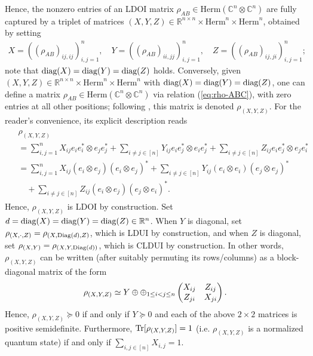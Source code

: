 \documentclass[11pt]{article}
\newcommand{\R}{\ensuremath{\mathbb{R}}}   %
\newcommand{\C}{\ensuremath{\mathbb{C}}} %
\newcommand{\Herm}{\mathrm{Herm}}
\newcommand{\Cnn}{\C^n\ot \C^n}
\newcommand{\Tr}{\text{\rm Tr}}
\newcommand{\diag}{\text{\rm diag}}
\newcommand{\Diag}{\text{\rm Diag}}
\newcommand{\ot}{\otimes}
\theoremstyle{plain}
\begin{document}
Hence,   the nonzero entries of an LDOI matrix $\rho_{AB}\in\Herm(\Cnn)$   are fully captured by a triplet of matrices $(X,Y,Z)\in \R^{n\times n} \times \Herm^n\times \Herm^n$, obtained by setting
\begin{align}\label{eq:rho-ABC}
X=((\rho_{AB})_{ij,ij})_{i,j=1}^n,\quad Y=((\rho_{AB})_{ii,jj})_{i,j=1}^n,\quad Z=((\rho_{AB})_{ij,ji})_{i,j=1}^n;
\end{align}
note that  $\diag(X)=\diag(Y)=\diag(Z)$ holds. 
Conversely,  given $(X,Y,Z)\in \R^{n\times n} \times \Herm^n\times \Herm^n$ with
$\diag(X)=\diag(Y)=\diag(Z)$, one can define a matrix 
$\rho_{AB} \in \Herm(\Cnn)$ via relation (\ref{eq:rho-ABC}), with zero entries at all other positions;  following \cite{SN-CLDUI}, this matrix is denoted $\rho_{(X,Y,Z)}$.
For the reader's convenience,  its explicit description reads
\begin{align}\label{eq:rhoXYZ0}
\begin{split}
&\rho_{(X,Y,Z)} \\
&=\sum_{i,j=1}^n X_{ij} e_ie_i^*\ot e_je_j^* +\sum_{i\ne j\in [n]} Y_{ij} e_ie_j^*\ot e_ie_j^*
+\sum_{i\ne j\in [n]} Z_{ij} e_ie_j^* \ot e_je_i^*\\
& =\sum_{i,j=1}^n X_{ij} (e_i\ot e_j) (e_i\ot e_j)^* +\sum_{i\ne j\in [n]} Y_{ij} (e_i\ot e_i)(e_j\ot e_j)^*\\
& \quad +\sum_{i\ne j\in [n]} Z_{ij} (e_i\ot e_j)(e_j\ot e_i)^*.
\end{split}
\end{align}
Hence,  $\rho_{(X,Y,Z)}$ is LDOI by construction. Set $d=\diag(X)=\diag(Y)=\diag(Z)\in\R^n$. When $Y$ is diagonal, set $\rho_{(X,\cdot,Z)}=\rho_{(X,\Diag(d),Z)}$, which is LDUI by construction, and 
when $Z$ is diagonal, set $\rho_{(X,Y)}=\rho_{(X,Y,\Diag(d))}$, which is CLDUI by construction. 
In other words, $\rho_{(X,Y,Z)}$ can be written (after suitably permuting its rows/columns) as a block-diagonal matrix of the form
\begin{align}\label{eq:rhoXYZ-block}
\rho_{(X,Y,Z)}\simeq Y \oplus \displaystyle\oplus_{1\le i<j\le n} \begin{pmatrix} X_{ij} & Z_{ij} \cr Z_{ji} & X_{ji}\end{pmatrix}.
\end{align}
Hence, $\rho_{(X,Y,Z)}\succeq 0$ if and only if $Y\succeq 0$ and each of the above $2\times 2$ matrices is positive semidefinite. Furthermore, $\Tr [\rho_{(X,Y,Z)}]=1$ (i.e. $\rho_{(X,Y,Z)}$ is a normalized quantum state) if and only if $\sum_{i,j\in[n]}X_{i,j}=1$.
\end{document}
